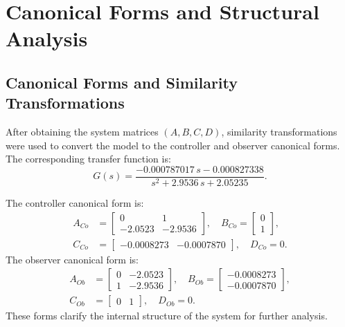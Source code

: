 \documentclass[12pt,a4paper]{article}
\begin{document}
\section{Canonical Forms and Structural Analysis}
\subsection{Canonical Forms and Similarity Transformations}
After obtaining the system matrices $(A,B,C,D)$, similarity transformations were used to convert the model to the controller and observer canonical forms. The corresponding transfer function is:
\[
G(s) = \frac{-0.000787017\,s - 0.000827338}{s^2 + 2.9536\,s + 2.05235}.
\]

The controller canonical form is:
\begin{align*}
A_{Co} &= \begin{bmatrix} 0 & 1 \\ -2.0523 & -2.9536 \end{bmatrix}, \quad
B_{Co} = \begin{bmatrix} 0 \\ 1 \end{bmatrix},\\
C_{Co} &= \begin{bmatrix} -0.0008273 & -0.0007870 \end{bmatrix}, \quad D_{Co}=0.
\end{align*}
The observer canonical form is:
\begin{align*}
A_{Ob} &= \begin{bmatrix} 0 & -2.0523 \\ 1 & -2.9536 \end{bmatrix}, \quad
B_{Ob} = \begin{bmatrix} -0.0008273 \\ -0.0007870 \end{bmatrix},\\
C_{Ob} &= \begin{bmatrix} 0 & 1 \end{bmatrix}, \quad D_{Ob}=0.
\end{align*}
These forms clarify the internal structure of the system for further analysis.
\end{document}

